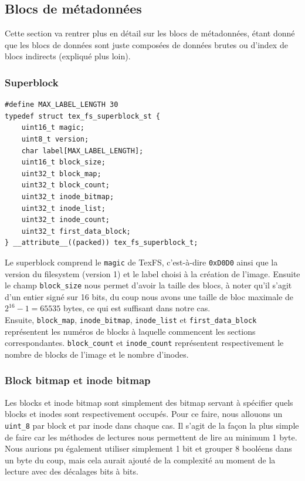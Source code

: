 \documentclass{article}
\begin{document}
\subsection{Blocs de métadonnées}
Cette section va rentrer plus en détail sur les blocs de métadonnées, étant donné que les blocs de données sont juste composées de données brutes ou d'index de blocs indirects (expliqué plus loin).
\subsubsection{Superblock}
\begin{verbatim}
#define MAX_LABEL_LENGTH 30
typedef struct tex_fs_superblock_st {
    uint16_t magic;
    uint8_t version;
    char label[MAX_LABEL_LENGTH];
    uint16_t block_size;
    uint32_t block_map;
    uint32_t block_count;
    uint32_t inode_bitmap;
    uint32_t inode_list;
    uint32_t inode_count;
    uint32_t first_data_block;
} __attribute__((packed)) tex_fs_superblock_t;	
\end{verbatim}
Le superblock comprend le \verb+magic+ de TexFS, c'est-à-dire \verb+0xD0D0+ ainsi que la version du filesystem (version 1) et le label choisi à la création de l'image. Ensuite le champ \verb+block_size+ nous permet d'avoir la taille des blocs, à noter qu'il s'agit d'un entier signé sur 16 bits, du coup nous avons une taille de bloc maximale de $2^{16}-1=65535$ bytes, ce qui est suffisant dans notre cas. \\

Ensuite, \verb+block_map+, \verb+inode_bitmap+, \verb+inode_list+ et \verb+first_data_block+ représentent les numéros de blocks à laquelle commencent les sections correspondantes. \verb+block_count+ et \verb+inode_count+ représentent respectivement le nombre de blocks de l'image et le nombre d'inodes.
\subsubsection{Block bitmap et inode bitmap}
Les blocks et inode bitmap sont simplement des bitmap servant à spécifier quels blocks et inodes sont respectivement occupés. Pour ce faire, nous allouons un \verb+uint_8+ par block et par inode dans chaque cas. Il s'agit de la façon la plus simple de faire car les méthodes de lectures nous permettent de lire au minimum 1 byte. Nous aurions pu également utiliser simplement 1 bit et grouper 8 booléens dans un byte du coup, mais cela aurait ajouté de la complexité au moment de la lecture avec des décalages bits à bits.\\
\end{document}

